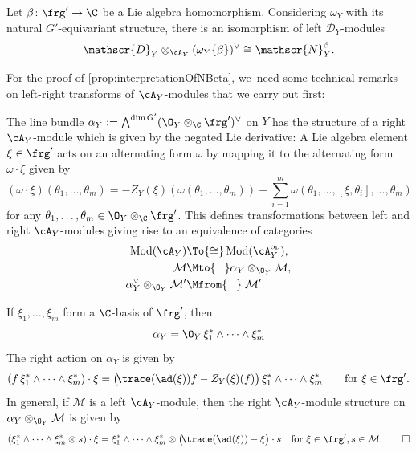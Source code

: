 \begin{prop} \label{prop:interpretationOfNBeta}
Let $\beta \colon \frg' \to \C$ be a Lie algebra homomorphism. Considering $\omega_Y$ with its natural $G'$-equivariant structure, there is an isomorphism of left $\mathscr{D}_Y$\nobreakdash-mod\-ules
\[
\mathscr{D}_Y \otimes_{\cA_Y} (\omega_Y\{\beta\})^\vee \cong \mathscr{N}_{Y}^{\beta}.
\]
\end{prop}

For the proof of \cref{prop:interpretationOfNBeta}, we~need some technical remarks on left-right transforms of $\cA_Y$\nobreakdash-mod\-ules that we carry out first:

The line bundle $\alpha_Y := \bigwedge^{\dim G'} (\O_Y \otimes_\C \frg')^\vee$ on $Y$ has the structure of a right $\cA_Y$\nobreakdash-mod\-ule which is given by the negated Lie derivative: A Lie algebra element $\xi \in \frg'$ acts on an alternating form $\omega$ by mapping it to the alternating form $\omega \cdot \xi$ given by
\[
(\omega \cdot \xi)(\theta_1,\dots,\theta_m) = -Z_Y(\xi)(\omega(\theta_1,\dots,\theta_m)) + \sum_{i=1}^m \omega(\theta_1,\dots,[\xi,\theta_i],\dots,\theta_m)
\]
for any $\theta_1,\dots,\theta_m \in \O_Y \otimes_\C \frg'$. This defines transformations between left and right $\cA_Y$\nobreakdash-mod\-ules giving rise to an equivalence of categories
\begin{align*}
\operatorname{Mod}(\cA_Y) &\To{\cong} \operatorname{Mod}(\cA_Y^{\text{op}}), \\
\mathcal M &\Mto{\hphantom{\cong}} \alpha_Y \otimes_{\O_Y} \mathcal M, \\
\alpha_Y^\vee \otimes_{\O_Y} \mathcal M' &\Mfrom{\hphantom{\cong}}\; \mathcal M'.
\end{align*}

\begin{rmk} \label{rem:explicitLeftRightTransform}
If $\xi_1,\dots,\xi_m$ form a $\C$-basis of $\frg'$, then
\[
\alpha_Y = \O_Y \, \xi_1^* \wedge \dots \wedge \xi_m^*
\]
The right action on $\alpha_Y$ is given by
\[
(f\, \xi_1^* \wedge \dots \wedge \xi_m^*) \cdot \xi = \big(\!\trace(\ad(\xi))f-Z_Y(\xi)(f)\big) \, \xi_1^* \wedge \dots \wedge \xi_m^* \qquad \text{for } \xi \in \frg'.
\]
In general, if $\mathcal M$ is a left $\cA_Y$\nobreakdash-mod\-ule, then the right $\cA_Y$\nobreakdash-mod\-ule structure on $\alpha_Y \otimes_{\O_Y} \mathcal M$ is given by
\[
(\xi_1^* \wedge \dots \wedge \xi_m^* \otimes s) \cdot \xi = \xi_1^* \wedge \dots \wedge \xi_m^* \otimes \big(\!\trace(\ad(\xi))-\xi\big) \cdot s \quad \text{for } \xi \in \frg', s \in \mathcal M.\qedhere
\]
\end{rmk}


